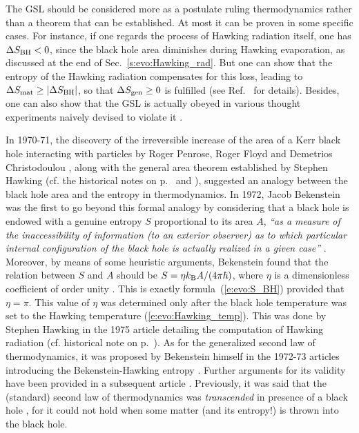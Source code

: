 The GSL should be considered more as a postulate ruling
thermodynamics rather than a theorem that can be established. At most it
can be proven in some specific cases.
For instance, if one regards the process of Hawking radiation itself, one
has $\Delta S_{\rm BH} < 0$, since the black hole area diminishes
during Hawking evaporation, as discussed at the end of
Sec.~\ref{s:evo:Hawking_rad}. But one can show that the entropy of the Hawking radiation
compensates for this loss, leading to $\Delta S_{\rm mat} \geq |\Delta S_{\rm BH}|$,
so that $ \Delta S_{\rm gen} \geq 0$ is fulfilled (see Ref.~\cite{Wald01} for details).
Besides, one can also show that the GSL is actually obeyed in various thought experiments
naively devised to violate it \cite{Carli14,Wald94,Wald01,Wall09}.

\begin{hist}
In 1970-71, the discovery of
the irreversible increase of the area of a Kerr black hole interacting with particles
by Roger Penrose, Roger Floyd
and Demetrios Christodoulou
\cite{PenroF71,Chris70}, along with
the general area theorem established by Stephen Hawking \cite{Hawki71}
(cf. the historical notes on p.~\pageref{h:evo:irreducible_mass} and \pageref{h:evo:area_increase}),
suggested an analogy between the black hole area and the entropy in thermodynamics.
In 1972, Jacob Bekenstein  \cite{Beken72,Beken73b} was the first
to go beyond this formal analogy by considering that
a black hole is endowed with a genuine entropy $S$ proportional to its area $A$,
\emph{``as a measure of the inaccessibility of information (to an exterior observer) as to which
particular internal configuration of the black hole is actually realized in a given case''} \cite{Beken73b}.
Moreover, by means of some heuristic arguments, Bekenstein found that the relation
between $S$ and $A$ should be $S = \eta k_{\rm B} A/(4\pi\hbar)$, where $\eta$ is a dimensionless coefficient of
order unity \cite{Beken72,Beken73b}. This is exactly formula~(\ref{e:evo:S_BH}) provided that $\eta = \pi$.
This value of $\eta$ was determined only after the black hole temperature was set to the Hawking temperature
(\ref{e:evo:Hawking_temp}). This was done by Stephen Hawking in the 1975 article detailing the
computation of Hawking radiation \cite{Hawki75} (cf. historical note on p.~\pageref{h:evo:Hawking_rad}).
As for the generalized second law of thermodynamics, it was proposed by Bekenstein himself in the 1972-73 articles introducing the Bekenstein-Hawking entropy \cite{Beken72,Beken73b}.
Further arguments for its validity have been provided in a subsequent article \cite{Beken74}.
Previously, it was said that the (standard) second law of thermodynamics was \emph{transcended}
in presence of a black hole \cite{BardeCH73,Carte73b}, for it could not hold when some matter (and its entropy!) is thrown into the black hole.
\end{hist}

